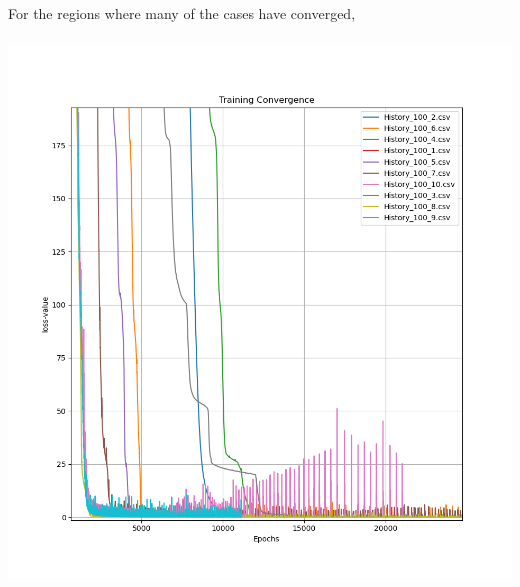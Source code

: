 \documentclass[a4paper, 12pt]{report}
\def\size{0.75}
\begin{document}
\begin{center}
\newpage
For the regions where many of the cases have converged,
\\~\\\includegraphics[scale=\size]{Width_100_Down.png}
\newpage

\end{center}
\end{document}
